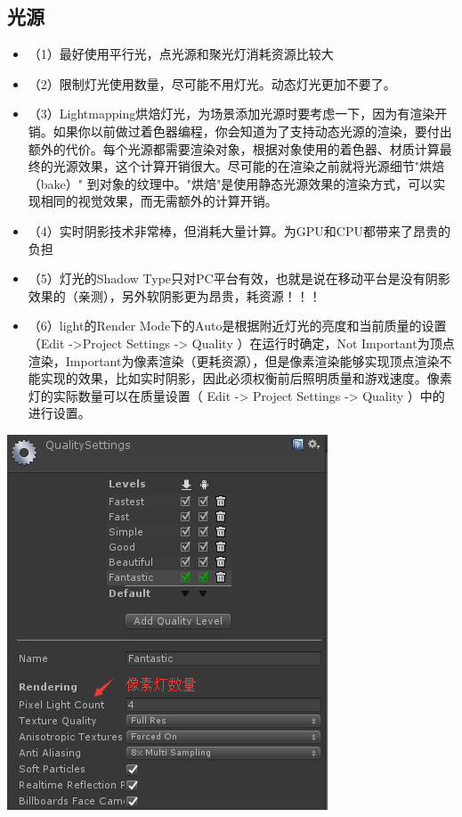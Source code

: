 \documentclass[9pt, b5paper]{article}
\begin{document}
\subsection{光源}
\label{sec:org3fe0c0b}
\begin{itemize}
\item （1）最好使用平行光，点光源和聚光灯消耗资源比较大
\item （2）限制灯光使用数量，尽可能不用灯光。动态灯光更加不要了。
\item （3）Lightmapping烘焙灯光，为场景添加光源时要考虑一下，因为有渲染开销。如果你以前做过着色器编程，你会知道为了支持动态光源的渲染，要付出额外的代价。每个光源都需要渲染对象，根据对象使用的着色器、材质计算最终的光源效果，这个计算开销很大。尽可能的在渲染之前就将光源细节"烘焙（bake）" 到对象的纹理中。"烘焙"是使用静态光源效果的渲染方式，可以实现相同的视觉效果，而无需额外的计算开销。
\item （4）实时阴影技术非常棒，但消耗大量计算。为GPU和CPU都带来了昂贵的负担
\item （5）灯光的Shadow Type只对PC平台有效，也就是说在移动平台是没有阴影效果的（亲测），另外软阴影更为昂贵，耗资源！！！
\item （6）light的Render Mode下的Auto是根据附近灯光的亮度和当前质量的设置（Edit ->Project Settings -> Quality ）在运行时确定，Not Important为顶点渲染，Important为像素渲染（更耗资源），但是像素渲染能够实现顶点渲染不能实现的效果，比如实时阴影，因此必须权衡前后照明质量和游戏速度。像素灯的实际数量可以在质量设置（ Edit -> Project Settings -> Quality ）中的进行设置。
\end{itemize}

\begin{center}
\includegraphics[width=.9\linewidth]{./pic/light.png}
\end{center}
\end{document}
